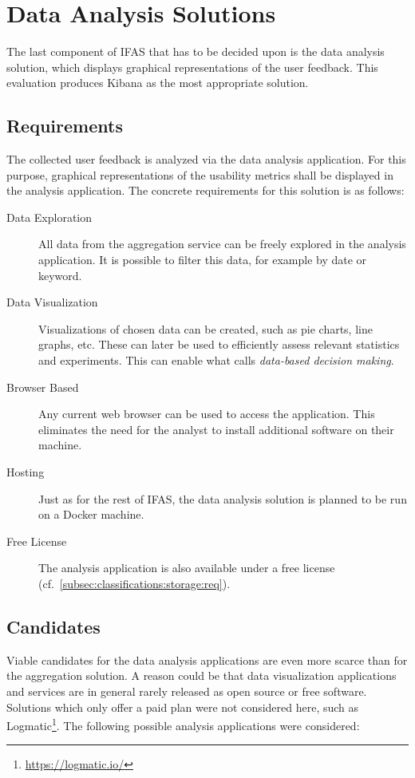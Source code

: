 \section{Data Analysis Solutions}
\label{sec:classifications:analysis}

The last component of \ac{IFAS} that has to be decided upon is the data analysis solution, which displays graphical representations of the user feedback.
This evaluation produces Kibana as the most appropriate solution.

\subsection{Requirements}

The collected user feedback is analyzed via the data analysis application.
For this purpose, graphical representations of the usability metrics shall be displayed in the analysis application.
The concrete requirements for this solution is as follows:

\begin{description}
\item[Data Exploration] All data from the aggregation service can be freely explored in the analysis application.
It is possible to filter this data, for example by date or keyword.
\item[Data Visualization] Visualizations of chosen data can be created, such as pie charts, line graphs, etc.
These can later be used to efficiently assess relevant statistics and experiments.
This can enable what \citet{Bosch2012} calls \emph{data-based decision making}.
\item[Browser Based] Any current web browser can be used to access the application.
This eliminates the need for the analyst to install additional software on their machine.
\item [Hosting] Just as for the rest of \ac{IFAS}, the data analysis solution is planned to be run on a Docker machine.
\item[Free License] The analysis application is also available under a free license (cf.~\cref{subsec:classifications:storage:req}).
\end{description}

\subsection{Candidates}

Viable candidates for the data analysis applications are even more scarce than for the aggregation solution.
A reason could be that data visualization applications and services are in general rarely released as open source or free software.
Solutions which only offer a paid plan were not considered here, such as Logmatic\footnote{\url{https://logmatic.io/}}.
The following possible analysis applications were considered:

